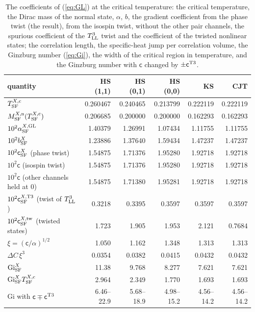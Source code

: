 \documentclass[aps,prd,onecolumn,superscriptaddress,nofootinbib,floatfix,longbibliography]{revtex4-2}
\newcommand{\LL}{{\rm LL}}
\newcommand{\SF}{{\rm SF}}
\begin{document}
\begin{table}[h]
\caption{\label{tab:gi}The coefficients of (\ref{eq:GL}) at the critical temperature: the critical temperature, the Dirac mass of
the normal state, $\alpha$, $b$, the gradient coefficient from the phase twist (the result), from the isospin twist, without the
other pair channels, the spurious coefficient of the $T^3_\LL$ twist and the coefficient of the twisted nonlinear states; the
correlation length, the specific-heat jump per correlation volume, the Ginzburg number (\ref{eq:Gi}), the width of the critical
region in temperature, and the Ginzburg number with $\mathsf c$ changed by $\pm\mathsf c^{\rm T3}$.}
\begin{ruledtabular}
\begin{tabular}{lrrrrr}
quantity & HS (1,1) & HS (0,1) & HS (0,0) & KS & CJT \\
\hline
$T^{X,{\rm c}}_\SF$ & 0.260467 & 0.240465 & 0.213799 & 0.222119 & 0.222119 \\
$M^{X,{\rm n}}_\SF(T^{X,{\rm c}}_\SF)$ & 0.206685 & 0.200000 & 0.200000 & 0.162293 & 0.162293 \\
$10^2\alpha^{X,{\rm GL}}_\SF$ & 1.40379 & 1.26991 & 1.07434 & 1.11755 & 1.11755 \\
$10^2b^X_\SF$ & 1.23886 & 1.37640 & 1.59434 & 1.47237 & 1.47237 \\
$10^2\mathsf c^X_\SF$ (phase twist) & 1.54875 & 1.71376 & 1.95280 & 1.92718 & 1.92718 \\
$10^2\mathsf c$ (isospin twist) & 1.54875 & 1.71376 & 1.95280 & 1.92718 & 1.92718 \\
$10^2\mathsf c$ (other channels held at 0) & 1.54875 & 1.71380 & 1.95281 & 1.92718 & 1.92718 \\
$10^2\mathsf c^{X,{\rm T3}}_\SF$ (twist of $T^3_\LL$) & 0.3218 & 0.3395 & 0.3597 & 0.3597 & 0.3597 \\
$10^2\mathsf c^{X,{\rm tw}}_\SF$ (twisted states) & 1.723 & 1.905 & 1.953 & 2.121 & 0.7684 \\
$\xi=(\mathsf c/\alpha)^{1/2}$ & 1.050 & 1.162 & 1.348 & 1.313 & 1.313 \\
$\Delta C\,\xi^3$ & 0.0354 & 0.0382 & 0.0415 & 0.0432 & 0.0432 \\
${\rm Gi}^X_\SF$ & 11.38 & 9.768 & 8.277 & 7.621 & 7.621 \\
${\rm Gi}^X_\SF T^{X,{\rm c}}_\SF$ & 2.964 & 2.349 & 1.770 & 1.693 & 1.693 \\
Gi with $\mathsf c\mp\mathsf c^{\rm T3}$ & 6.46--22.9 & 5.68--18.9 & 4.98--15.2 & 4.56--14.2 & 4.56--14.2 \\
\end{tabular}
\end{ruledtabular}
\end{table}
\end{document}
